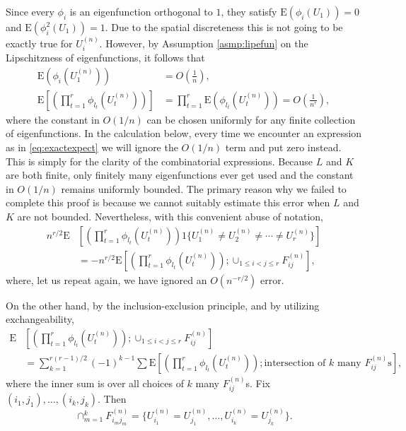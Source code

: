 \documentclass{amsart}
\newcommand{\E}{\mathrm{E}}
\begin{document}

Since every $\phi_i$ is an eigenfunction orthogonal to $1$, they satisfy $\E(\phi_i(U_1))=0$ and $\E(\phi_i^2(U_1))=1$. 
Due to the spatial discreteness this is not going to be exactly true for $U_i^{(n)}$. However, by Assumption \ref{asmp:lipefun} on the Lipschitzness of eigenfunctions, it follows that 
\begin{equation}\label{eq:exactexpect}
\begin{split}
\E\left( \phi_i(U^{(n)}_1)\right) &= O\left( \frac{1}{n} \right), \\
 \E\left[\left(\prod_{t=1}^r \phi_{l_t}(U^{(n)}_t)\right) \right] &= \prod_{t=1}^r \E\left( \phi_{l_t}(U^{(n)}_t) \right) =O\left( \frac{1}{n^r}\right),
\end{split}
\end{equation} 
where the constant in $O(1/n)$ can be chosen uniformly for any finite collection of eigenfunctions. In the calculation below, every time we encounter an expression as in \eqref{eq:exactexpect} we will ignore the $O(1/n)$ term and put zero instead. This is simply for the clarity of the combinatorial expressions. Because $L$ and $K$ are both finite, only finitely many eigenfunctions ever get used and the constant in $O(1/n)$ remains uniformly bounded. The primary reason why we failed to complete this proof is because we cannot suitably estimate this error when $L$ and $K$ are not bounded. Nevertheless, with this convenient abuse  of notation,
\[
\begin{split}
n^{r/2}\E&\left[\left(\prod_{t=1}^r \phi_{l_t}(U^{(n)}_t)\right) 1\{ U^{(n)}_1 \neq U^{(n)}_2 \neq \cdots \neq U^{(n)}_r\} \right]\\
&=- n^{r/2}\E\left[\left(\prod_{t=1}^r \phi_{l_t}(U^{(n)}_t)\right); \cup_{1\le i < j \le r} F^{(n)}_{ij} \right],
\end{split}
\]
where, let us repeat again, we have ignored an $O(n^{-r/2})$ error. 



On the other hand, by the inclusion-exclusion principle, and by utilizing exchangeability,
\[
\begin{split}
    \E&\left[\left(\prod_{t=1}^r \phi_{l_t}(U^{(n)}_t)\right); \cup_{1\le i < j \le r} F^{(n)}_{ij} \right]\\
    &=\sum_{k=1}^{r(r-1)/2} (-1)^{k-1} \sum \E\left[\left(\prod_{t=1}^r \phi_{l_t}(U^{(n)}_t)\right); \text{intersection of $k$ many $F^{(n)}_{ij}$s} \right], 
\end{split}
\]
where the inner sum is over all choices of $k$ many $F^{(n)}_{ij}$s. Fix $(i_1, j_1), \ldots, (i_k, j_k)$. Then 
\[
\cap_{m=1}^k F^{(n)}_{i_m j_m}= \{ U^{(n)}_{i_1}=U^{(n)}_{j_1}, \ldots, U^{(n)}_{i_k}=U^{(n)}_{j_k}\}. 
\]
\end{document}
